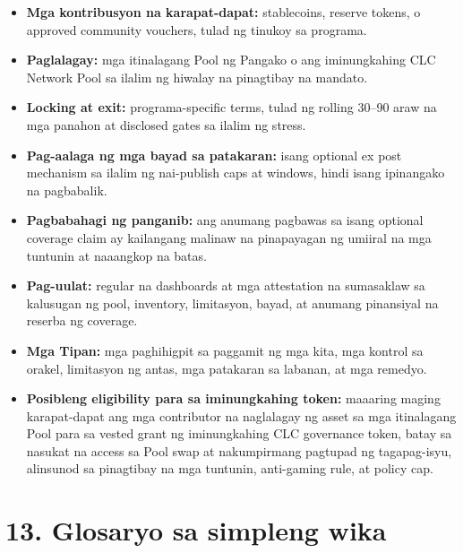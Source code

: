 \documentclass[11pt]{article}
\begin{document}
\begin{itemize}[leftmargin=*]
\item \textbf{Mga kontribusyon na karapat-dapat:} stablecoins, reserve tokens, o approved community vouchers, tulad ng tinukoy sa programa.
\item \textbf{Paglalagay:} mga itinalagang Pool ng Pangako o ang iminungkahing CLC Network Pool sa ilalim ng hiwalay na pinagtibay na mandato.
\item \textbf{Locking at exit:} programa-specific terms, tulad ng rolling 30--90 araw na mga panahon at disclosed gates sa ilalim ng stress.
\item \textbf{Pag-aalaga ng mga bayad sa patakaran:} isang optional ex post mechanism sa ilalim ng nai-publish caps at windows, hindi isang ipinangako na pagbabalik.
\item \textbf{Pagbabahagi ng panganib:} ang anumang pagbawas sa isang optional coverage claim ay kailangang malinaw na pinapayagan ng umiiral na mga tuntunin at naaangkop na batas.
\item \textbf{Pag-uulat:} regular na dashboards at mga attestation na sumasaklaw sa kalusugan ng pool, inventory, limitasyon, bayad, at anumang pinansiyal na reserba ng coverage.
\item \textbf{Mga Tipan:} mga paghihigpit sa paggamit ng mga kita, mga kontrol sa orakel, limitasyon ng antas, mga patakaran sa labanan, at mga remedyo.
\item \textbf{Posibleng eligibility para sa iminungkahing token:} maaaring maging karapat-dapat ang mga contributor na naglalagay ng asset sa mga itinalagang Pool para sa vested grant ng iminungkahing CLC governance token, batay sa nasukat na access sa Pool swap at nakumpirmang pagtupad ng tagapag-isyu, alinsunod sa pinagtibay na mga tuntunin, anti-gaming rule, at policy cap.
\end{itemize}


\section*{13. Glosaryo sa simpleng wika}
\end{document}
